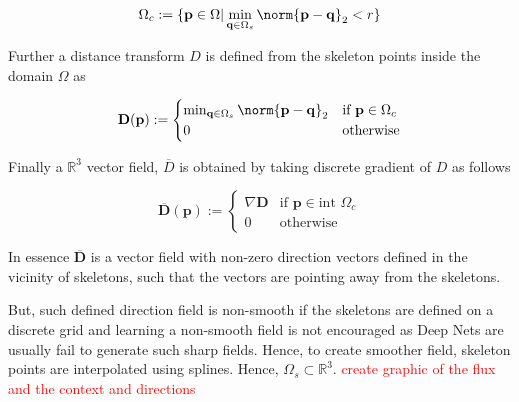 \DeclarePairedDelimiter\norm\lVert\rVert

\begin{equation}
{\Omega}_c := \{ \mathbf{p} \in \Omega \vert \min_{\mathbf{q} \in \Omega_s} \norm{\mathbf{p} - \mathbf{q}}_2 < r \} 
\end{equation}

Further a distance transform $D$ is defined from the skeleton points inside the domain $\Omega$ as

\begin{equation}
\mathbf{D}(\mathbf{p}) := \begin{cases}
		\min_{\mathbf{q} \in \Omega_s} \norm{\mathbf{p}-\mathbf{q}}_2 & \text{if } \mathbf{p} \in \Omega_c \\
		0  & \text{otherwise}
		\end{cases} 
\end{equation}

Finally a $\mathbb{R}^3$ vector field, $\overline{D}$ is obtained by taking discrete gradient of $D$ as follows

\begin{equation}
 \overline{\mathbf{D}}(\mathbf{p}) := \begin{cases}
 \nabla \mathbf{D} & \text{if } \mathbf{p} \in \text{int } \Omega_c \\
 0  & \text{otherwise}
 \end{cases} 
\end{equation}
 
In essence $\overline{\mathbf{D}}$ is a vector field with non-zero direction vectors defined in the vicinity of skeletons, such that the vectors are pointing away from the skeletons.

But, such defined direction field is non-smooth if the skeletons are defined on a discrete grid and learning a non-smooth field is not encouraged as Deep Nets are usually fail to generate such sharp fields. Hence, to create smoother field, skeleton points are interpolated using splines. Hence, $\Omega_s \subset \mathbb{R}^3$. \textcolor{red}{create graphic of the flux and the context and directions}

